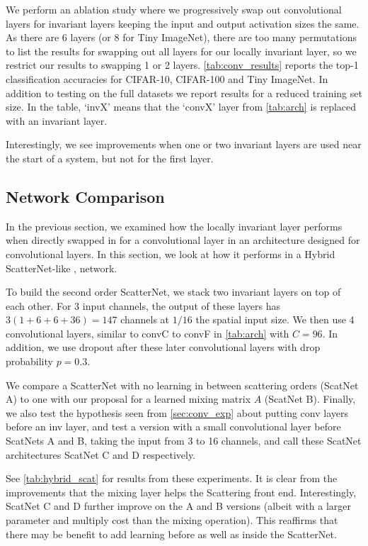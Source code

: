 

We perform an ablation study where we progressively swap out convolutional
layers for invariant layers keeping the input and output activation sizes the
same. As there are 6 layers (or 8 for Tiny ImageNet), there are too many
permutations to list the results for swapping out all layers for our locally
invariant layer, so we restrict our results to swapping 1 or 2 layers. 
\autoref{tab:conv_results} reports the top-1 classification accuracies for
CIFAR-10, CIFAR-100 and Tiny ImageNet. In addition to testing on the full
datasets we report results for a reduced training set size. In the table, `invX'
means that the `convX' layer from \autoref{tab:arch} is replaced with an 
invariant layer.

Interestingly, we see improvements when one or two invariant layers are used near the
start of a system, but not for the first layer. 


\subsection{Network Comparison}\label{sec:scat_exp}
In the previous section, we examined how the locally invariant layer performs when
directly swapped in for a convolutional layer in an architecture designed
for convolutional layers. In this section, we look at how
it performs in a Hybrid ScatterNet-like \cite{oyallon_hybrid_2017,oyallon_scaling_2017},
network.

To build the second order ScatterNet, we stack two invariant layers on top of each
other. For 3 input channels, the output of these layers has $3(1 +
6 + 6 +36) = 147$ channels at $1/16$ the spatial input size. We then use 4
convolutional layers, similar to convC to convF in \autoref{tab:arch} with
$C=96$. In addition, we use dropout after these later convolutional layers with drop probability $p=0.3$.

We compare a ScatterNet with no learning in between scattering orders
(ScatNet A) to one with our proposal for a learned mixing matrix $A$ (ScatNet B). Finally,
we also test the hypothesis seen from \autoref{sec:conv_exp} about putting conv
layers before an inv layer, and test a version with a small convolutional layer
before ScatNets A and B, taking the input from 3 to 16 channels, and call these ScatNet
architectures ScatNet C and D respectively.

See \autoref{tab:hybrid_scat} for results from these experiments. It is clear from
the improvements that the mixing layer helps the Scattering front end.
Interestingly, ScatNet C and D further improve on the A and B versions
(albeit with a larger parameter and multiply cost than the mixing operation). This reaffirms that there
may be benefit to add learning before as well as inside the ScatterNet.

